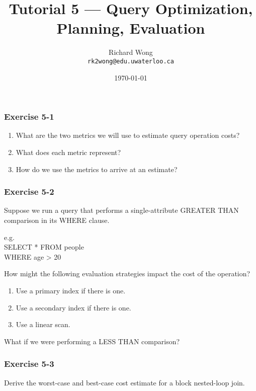 

\title{Tutorial 5 --- Query Optimization, Planning, Evaluation }

\author{Richard Wong \\ \small \texttt{rk2wong@edu.uwaterloo.ca}}
\date{\today}




\begin{frame}
  \titlepage

\end{frame}


\begin{frame}
\frametitle{Exercise 5-1}

\begin{enumerate}
  \item What are the two metrics we will use to estimate query operation costs?
  \item What does each metric represent?
  \item How do we use the metrics to arrive at an estimate?
\end{enumerate}

\end{frame}


\begin{frame}
\frametitle{Exercise 5-2}

Suppose we run a query that performs a single-attribute GREATER THAN comparison in its WHERE clause.

e.g. \\
SELECT * FROM people \\
WHERE age > 20

How might the following evaluation strategies impact the cost of the operation?

\begin{enumerate}
  \item Use a primary index if there is one.
  \item Use a secondary index if there is one.
  \item Use a linear scan.
\end{enumerate}

What if we were performing a LESS THAN comparison?

\end{frame}


\begin{frame}
\frametitle{Exercise 5-3}

Derive the worst-case and best-case cost estimate for a block nested-loop join.

\end{frame}


